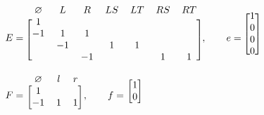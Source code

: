 \documentclass[11pt]{tufte-handout}
\theoremstyle{plain}
\theoremstyle{definition}
\theoremstyle{remark}
\begin{document}
$ E = \begin{blockarray}{c c c c c c c}
            \varnothing & L & R & LS & LT & RS & RT \\
            \begin{block}{[c c c c c c c]}
                1 &    &   &   &  &  &\\
               -1 & 1  & 1 &   &  &  &\\
                  & -1 &   & 1 & 1   & \\
                  &    &-1 &   &  & 1 & 1 \\
            \end{block}
            \end{blockarray},\quad\quad
    e = \begin{blockarray}{[c]}
                1 \\
                0 \\
                0 \\
                0 \\
            \end{blockarray}
$
\newline
$
    F = \begin{blockarray}{c c c}
            \varnothing & l & r\\
            \begin{block}{[c c c]}
                1 &    &  \\
               -1 & 1  & 1 \\
            \end{block}
            \end{blockarray}, \quad\quad
    f = \begin{blockarray}{[c]}
                1 \\
                0 \\
            \end{blockarray}
$
\newpage
\end{document}
